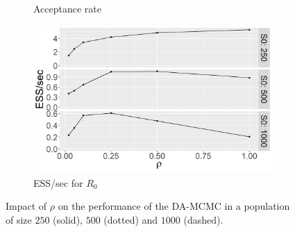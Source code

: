 \documentclass{beamer}
\begin{document}
\begin{frame}
\begin{figure}
\begin{subfigure}[b]{0.32\textwidth}
		\caption{Acceptance rate}
		\label{fig:E3_accept}
	\end{subfigure}
	\hfill
	\begin{subfigure}[b]{0.32\textwidth}
		\centering
		\includegraphics[width=\textwidth]{E3_facet_ESSsecR0}
		\caption{ESS/sec for $R_0$
		}
		\label{fig:E3_facet_ESSsecR0}
	\end{subfigure}
	\caption{Impact of $\rho$ on the performance of the DA-MCMC in a population of size $250$ (solid), $500$ (dotted) and $1000$ (dashed).}
	\label{fig:E3}
\end{figure}
	
\end{frame}
\end{document}

